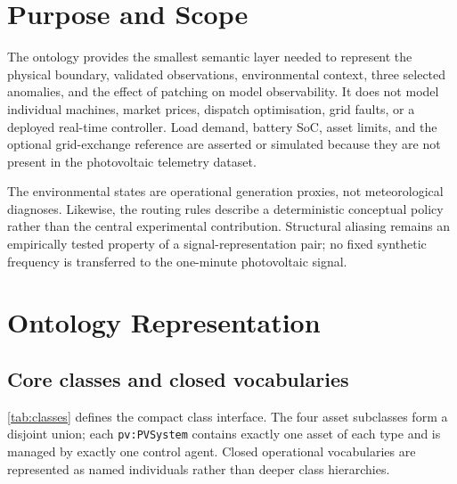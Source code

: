\documentclass[
	letterpaper,
	10pt,
	unnumberedsections,
	twoside,
]{LTJournalArticle}
\newcommand{\pv}[1]{\texttt{pv:#1}}
\begin{document}
\section{Purpose and Scope}

The ontology provides the smallest semantic layer needed to represent the physical boundary, validated observations, environmental context, three selected anomalies, and the effect of patching on model observability. It does not model individual machines, market prices, dispatch optimisation, grid faults, or a deployed real-time controller. Load demand, battery SoC, asset limits, and the optional grid-exchange reference are asserted or simulated because they are not present in the photovoltaic telemetry dataset.

The environmental states are operational generation proxies, not meteorological diagnoses. Likewise, the routing rules describe a deterministic conceptual policy rather than the central experimental contribution. Structural aliasing remains an empirically tested property of a signal-representation pair; no fixed synthetic frequency is transferred to the one-minute photovoltaic signal.

\section{Ontology Representation}

\subsection{Core classes and closed vocabularies}

\autoref{tab:classes} defines the compact class interface. The four asset subclasses form a disjoint union; each \pv{PVSystem} contains exactly one asset of each type and is managed by exactly one control agent. Closed operational vocabularies are represented as named individuals rather than deeper class hierarchies.
\end{document}
